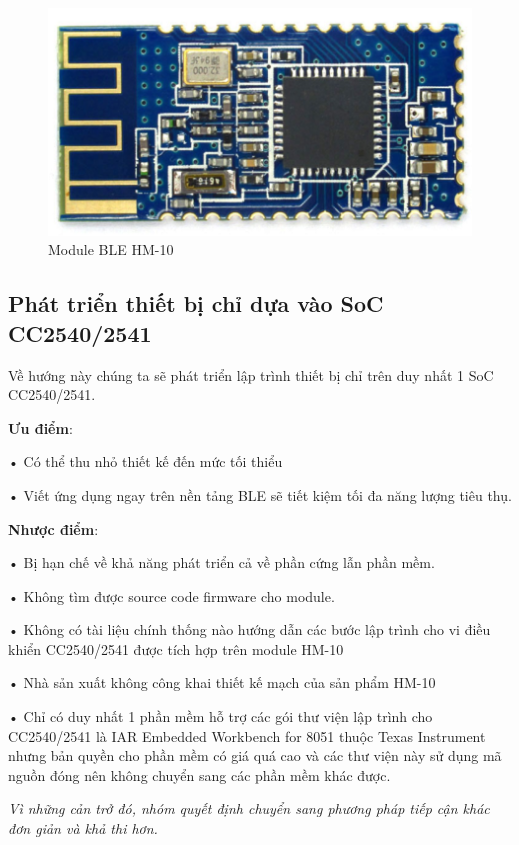 \begin{figure}[h]
	\centering    
	\includegraphics[width=1.0\textwidth]{hm10}
	\caption[Module BLE HM-10]{Module BLE HM-10}
	\label{fig: c2-hm10}
\end{figure}

\subsection{Phát triển thiết bị chỉ dựa vào SoC CC2540/2541}

Về hướng này chúng ta sẽ phát triển lập trình thiết bị chỉ trên duy nhất 1 SoC CC2540/2541.

\textbf{Ưu điểm}: 

• Có thể thu nhỏ thiết kế đến mức tối thiểu

• Viết ứng dụng ngay trên nền tảng BLE sẽ tiết kiệm tối đa năng lượng tiêu thụ.

\textbf{Nhược điểm}: 

• Bị hạn chế về khả năng phát triển cả về phần cứng lẫn phần mềm.

• Không tìm được source code firmware cho module.

• Không có tài liệu chính thống nào hướng dẫn các bước lập trình cho vi điều khiển CC2540/2541 được tích hợp trên module HM-10

• Nhà sản xuất không công khai thiết kế mạch của sản phẩm HM-10

• Chỉ có duy nhất 1 phần mềm hỗ trợ các gói thư viện lập trình cho CC2540/2541 là IAR Embedded Workbench for 8051 thuộc Texas Instrument nhưng bản quyền cho phần mềm có giá quá cao và các thư viện này sử dụng mã nguồn đóng nên không chuyển sang các phần mềm khác được.

\textit{Vì những cản trở đó, nhóm quyết định chuyển sang phương pháp tiếp cận khác đơn giản và khả thi hơn.}

